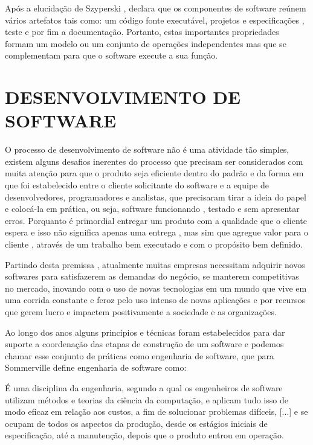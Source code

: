\documentclass[
	12pt,				%
	oneside,			%
	a4paper,			%
  section=TITLE,
	brazil,				%
	]{abntex2}
\begin{document}
Após a elucidação de Szyperski ,\cite{Dsouza}  declara que os componentes de
software reúnem vários artefatos tais como: um código fonte executável, projetos e
especificações , teste e por fim a documentação. Portanto, estas importantes
propriedades formam um modelo ou um conjunto de operações independentes mas que se
complementam para que o software execute a sua função.

\section{DESENVOLVIMENTO DE SOFTWARE}

O processo de desenvolvimento de software não é uma atividade tão simples,
existem alguns desafios inerentes do processo que precisam ser considerados com
muita atenção para que o produto seja eficiente dentro do padrão e da forma em
que foi estabelecido entre o cliente solicitante do software e a equipe de
desenvolvedores, programadores e analistas, que precisaram tirar a ideia do
papel e colocá-la em prática, ou seja, software funcionando , testado e sem
apresentar erros. Porquanto é primordial entregar um produto com a qualidade
que o cliente espera e isso não significa apenas uma entrega , mas sim que
agregue valor para o cliente , através de um trabalho bem executado e com o
propósito bem definido.

Partindo desta premissa , atualmente muitas empresas necessitam adquirir novos
softwares para satisfazerem as demandas do negócio, se manterem competitivas no mercado,
inovando com o uso de novas tecnologias em um mundo que vive em uma corrida constante e
feroz pelo uso intenso de novas aplicações e por recursos que gerem lucro e impactem
positivamente a sociedade e as organizações.

Ao longo dos anos alguns princípios e técnicas foram estabelecidos para dar suporte
a coordenação das etapas de construção de um software e podemos chamar esse conjunto de
práticas como engenharia de software, que para  Sommerville define engenharia de software
como:
\begin{citacao}
É uma disciplina da engenharia, segundo a qual os engenheiros de software
utilizam métodos e teorias da ciência da computação, e aplicam tudo isso de
modo eficaz em relação aos custos, a fim de solucionar problemas difíceis, [...]
e se ocupam de todos os aspectos da produção, desde os estágios iniciais de
especificação, até a manutenção, depois que o produto entrou em operação.\cite{sommerville2019engenharia}
\end{citacao}
\end{document}
